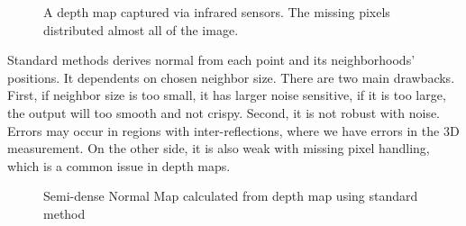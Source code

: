 \begin{figure}[!h]
	\centering
	\caption{A depth map captured via infrared sensors. The missing pixels distributed almost all of the image.}
	\label{fig:depth_map_with_noise}
\end{figure}

Standard methods derives normal from each point and its neighborhoods' positions. It dependents on chosen neighbor size. There are two main drawbacks. First, if neighbor size is too small, it has larger noise sensitive, if it is too large, the output will too smooth and not crispy. Second, it is not robust with noise.  Errors may occur in regions with inter-reflections, where we have errors in the 3D measurement. On the other side, it is also weak with missing pixel handling, which is a common issue in depth maps.

\begin{figure}[!h]
	\centering
	\caption{Semi-dense Normal Map calculated from depth map using standard method}
	\label{fig:standard_normal_inference}
\end{figure}

